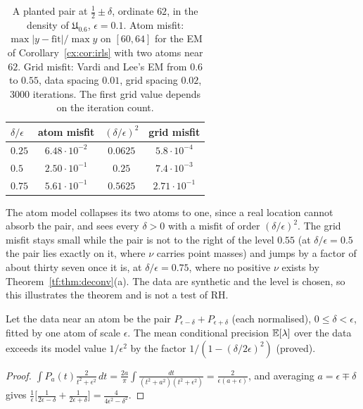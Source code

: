 \begin{table}[h]
\centering\footnotesize
\begin{tabular}{@{}lccc@{}}
\toprule
$\delta/\epsilon$ & atom misfit & $(\delta/\epsilon)^2$ & grid misfit \\
\midrule
$0.25$ & $6.48\cdot10^{-2}$ & $0.0625$ & $5.8\cdot10^{-4}$ \\
$0.5$ & $2.50\cdot10^{-1}$ & $0.25$ & $7.4\cdot10^{-3}$ \\
$0.75$ & $5.61\cdot10^{-1}$ & $0.5625$ & $2.71\cdot10^{-1}$ \\
\bottomrule
\end{tabular}
\caption{A planted pair at $\tfrac12\pm\delta$, ordinate $62$, in the density of $\mathfrak U_{0.6}$, $\epsilon=0.1$. Atom misfit: $\max|y-\mathrm{fit}|/\max y$ on $[60,64]$ for the EM of Corollary~\ref{cx:cor:irls} with two atoms near $62$. Grid misfit: Vardi and Lee's EM from $0.6$ to $0.55$, data spacing $0.01$, grid spacing $0.02$, $3000$ iterations. The first grid value depends on the iteration count.}\label{cx:tab:planted}
\end{table}

The atom model collapses its two atoms to one, since a real location cannot absorb the pair, and sees every $\delta>0$ with a misfit of order $(\delta/\epsilon)^2$. The grid misfit stays small while the pair is not to the right of the level $0.55$ (at $\delta/\epsilon=0.5$ the pair lies exactly on it, where $\nu$ carries point masses) and jumps by a factor of about thirty seven once it is, at $\delta/\epsilon=0.75$, where no positive $\nu$ exists by Theorem~\ref{tf:thm:deconv}(a). The data are synthetic and the level is chosen, so this illustrates the theorem and is not a test of RH.

\begin{proposition}\label{cx:prop:prec}
Let the data near an atom be the pair $P_{\epsilon-\delta}+P_{\epsilon+\delta}$ (each normalised), $0\le\delta<\epsilon$, fitted by one atom of scale $\epsilon$. The mean conditional precision $\mathbb{E}[\lambda]$ over the data exceeds its model value $1/\epsilon^2$ by the factor $1/(1-(\delta/2\epsilon)^2)$ (proved).
\end{proposition}

\begin{proof}
$\int P_a(t)\frac2{t^2+\epsilon^2}\,dt=\frac{2a}\pi\int\frac{dt}{(t^2+a^2)(t^2+\epsilon^2)}=\frac2{\epsilon(a+\epsilon)}$, and averaging $a=\epsilon\mp\delta$ gives $\frac1\epsilon\bigl[\frac1{2\epsilon-\delta}+\frac1{2\epsilon+\delta}\bigr]=\frac4{4\epsilon^2-\delta^2}$.
\end{proof}

